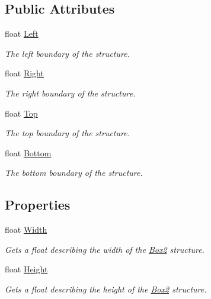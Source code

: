 \subsection*{Public Attributes}
\begin{DoxyCompactItemize}
\item 
float \hyperlink{struct_open_t_k_1_1_box2_a51cc4c52d76b880d9671100b313695e9}{Left}
\begin{DoxyCompactList}\small\item\em The left boundary of the structure. \end{DoxyCompactList}\item 
float \hyperlink{struct_open_t_k_1_1_box2_a74433a0faff0a2e3cfc378b9e38baf0f}{Right}
\begin{DoxyCompactList}\small\item\em The right boundary of the structure. \end{DoxyCompactList}\item 
float \hyperlink{struct_open_t_k_1_1_box2_a1199b632ff542a034839df4033c6e91d}{Top}
\begin{DoxyCompactList}\small\item\em The top boundary of the structure. \end{DoxyCompactList}\item 
float \hyperlink{struct_open_t_k_1_1_box2_a2402181128d362b332ab28327073eaee}{Bottom}
\begin{DoxyCompactList}\small\item\em The bottom boundary of the structure. \end{DoxyCompactList}\end{DoxyCompactItemize}
\subsection*{Properties}
\begin{DoxyCompactItemize}
\item 
float \hyperlink{struct_open_t_k_1_1_box2_a29d85bf58aacaa02bb3869d1b6f0d6a0}{Width}
\begin{DoxyCompactList}\small\item\em Gets a float describing the width of the \hyperlink{struct_open_t_k_1_1_box2}{Box2} structure. \end{DoxyCompactList}\item 
float \hyperlink{struct_open_t_k_1_1_box2_a2b86d70da5b355bcd176649e325a535f}{Height}
\begin{DoxyCompactList}\small\item\em Gets a float describing the height of the \hyperlink{struct_open_t_k_1_1_box2}{Box2} structure. \end{DoxyCompactList}\end{DoxyCompactItemize}


